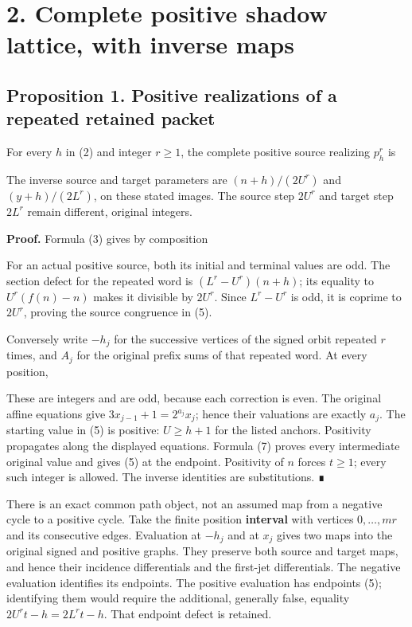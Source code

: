 \section{2. Complete positive shadow lattice, with inverse maps}

\subsection{Proposition 1. Positive realizations of a repeated retained
packet}

For every \(h\) in (2) and integer \(r\ge1\), the complete positive
source realizing \(p_h^r\) is


The inverse source and target parameters are \((n+h)/(2U^r)\) and
\((y+h)/(2L^r)\), on these stated images. The source step \(2U^r\) and
target step \(2L^r\) remain different, original integers.

\textbf{Proof.} Formula (3) gives by composition


For an actual positive source, both its initial and terminal values are
odd. The section defect for the repeated word is \((L^r-U^r)(n+h)\); its
equality to \(U^r(f(n)-n)\) makes it divisible by \(2U^r\). Since
\(L^r-U^r\) is odd, it is coprime to \(2U^r\), proving the source
congruence in (5).

Conversely write \(-h_j\) for the successive vertices of the signed
orbit repeated \(r\) times, and \(A_j\) for the original prefix sums of
that repeated word. At every position,


These are integers and are odd, because each correction is even. The
original affine equations give \(3x_{j-1}+1=2^{a_j}x_j\); hence their
valuations are exactly \(a_j\). The starting value in (5) is positive:
\(U\ge h+1\) for the listed anchors. Positivity propagates along the
displayed equations. Formula (7) proves every intermediate original
value and gives (5) at the endpoint. Positivity of \(n\) forces
\(t\ge1\); every such integer is allowed. The inverse identities are
substitutions. ∎

There is an exact common path object, not an assumed map from a negative
cycle to a positive cycle. Take the finite position \textbf{interval}
with vertices \(0,\ldots,mr\) and its consecutive edges. Evaluation at
\(-h_j\) and at \(x_j\) gives two maps into the original signed and
positive graphs. They preserve both source and target maps, and hence
their incidence differentials and the first-jet differentials. The
negative evaluation identifies its endpoints. The positive evaluation
has endpoints (5); identifying them would require the additional,
generally false, equality \(2U^r t-h=2L^r t-h\). That endpoint defect is
retained.

